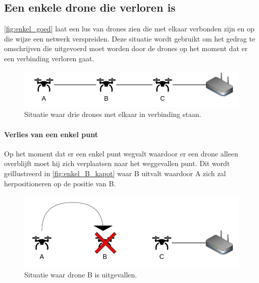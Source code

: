 \documentclass[a4paper, 11pt, oneside]{report}
\begin{document}
\subsection{Een enkele drone die verloren is}\label{sec:een-enkele-drone-die-verloren-is}
\autoref{fig:enkel_goed} laat een lus van drones zien die met elkaar verbonden zijn en op die wijze een netwerk verspreiden. Deze situatie wordt gebruikt om het gedrag te omschrijven die uitgevoerd moet worden door de drones op het moment dat er een verbinding verloren gaat. 
\begin{figure}[H]
	\begin{center}\includegraphics[width=.85\linewidth]{Afbeeldingen/droneopstelling_enkel_goed.png}\end{center}
	\caption{Situatie waar drie drones met elkaar in verbinding staan.}
	\label{fig:enkel_goed}
\end{figure} 

\paragraph{Verlies van een enkel punt}
Op het moment dat er een enkel punt wegvalt waardoor er een drone alleen overblijft moet hij zich verplaatsen naar het weggevallen punt. Dit wordt geïllustreerd in \autoref{fig:enkel_B_kapot} waar B uitvalt waardoor A zich zal herpositioneren op de positie van B. 
\begin{figure}[H]
	\begin{center}\includegraphics[width=.85\linewidth]{Afbeeldingen/droneopstelling_enkel_B_kapot.png}\end{center}
	\caption{Situatie waar drone B is uitgevallen.}
	\label{fig:enkel_B_kapot}
\end{figure}
\end{document}

